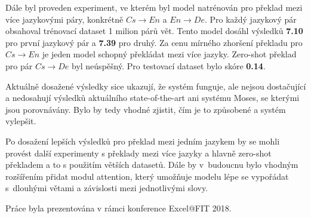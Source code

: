 Dále byl proveden experiment, ve kterém byl model natrénován pro překlad mezi více jazykovými páry, konkrétně $Cs\rightarrow En$ a $En\rightarrow De$. Pro každý jazykový pár obsahoval trénovací dataset 1 milion párů vět. Tento model dosáhl výsledků \textbf{7.10} pro první jazykový pár a \textbf{7.39} pro druhý. Za cenu mírného zhoršení překladu pro $Cs\rightarrow En$ je jeden model schopný překládat mezi více jazyky. Zero-shot překlad pro pár $Cs\rightarrow De$ byl neúspěšný. Pro testovací dataset bylo skóre \textbf{0.14}.

Aktuálně dosažené výsledky sice ukazují, že systém funguje, ale nejsou dostačující a nedosahují výsledků aktuálního state-of-the-art ani systému Moses, se kterými jsou porovnávány. Bylo by tedy vhodné zjistit, čím je to způsobené a systém vylepšit.

Po dosažení lepších výsledků pro překlad mezi jedním jazykem by se mohli provést další experimenty s překlady mezi více jazyky a hlavně zero-shot překladem a to s použitím větších datasetů. Dále by v~budoucnu bylo vhodným rozšířením přidat modul attention, který umožňuje modelu lépe se vypořádat s~dlouhými větami a závislosti mezi jednotlivými slovy.

Práce byla prezentována v rámci konference Excel@FIT 2018.


